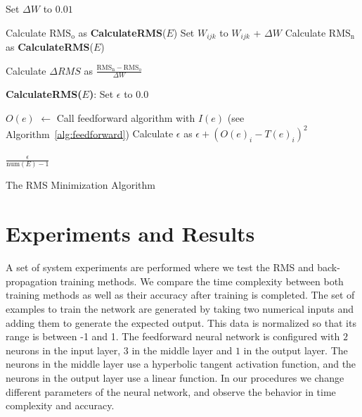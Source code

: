 \documentclass[11pt]{article}
\begin{document}
\begin{algorithm}%
\dontprintsemicolon
{}
Set $\Delta W$ to $0.01$\;
\SetLine
{}
{
	{
		{
				{
					Calculate $\mbox{RMS}_{\mbox{o}}$ as \textbf{CalculateRMS}($E$)\;
					Set $W_{ijk}$ to $W_{ijk}$ + $\Delta W$\;
					Calculate $\mbox{RMS}_{\mbox{n}}$ as \textbf{CalculateRMS}($E$)\;
				
					Calculate $\Delta RMS$ as $ \frac{\mbox{RMS}_{\mbox{n}}-\mbox{RMS}_{\mbox{o}}}{\Delta W} $\;
				
				}
		}
	}
}

\textbf{CalculateRMS($E$)}:
\dontprintsemicolon
{} 
Set $\epsilon$ to $0.0$\;
{
	$O(e)$ $\leftarrow$  Call feedforward algorithm with $I(e)$ (see Algorithm~\ref{alg:feedforward})\;
	{
		Calculate $\epsilon$ as $\epsilon + (O(e)_{i} - T(e)_{i})^{2}$\;
	} 
	
}
\Return $\frac{\epsilon}{\mbox{num}(E) - 1}$ 
\vspace{5mm}
\caption{The RMS Minimization Algorithm}
\label{alg:RMSminimization}
\end{algorithm}




\section{Experiments and Results} %
\label{sec:results}

A set of system experiments are performed where we test the RMS and back-propagation training methods. We compare the time complexity
between both training methods as well as their accuracy after training is completed. The set of examples to train the network are
generated by taking two numerical inputs and adding them to generate the expected output. This data is normalized so that its range is
between -1 and 1. The feedforward neural network is configured with $2$ neurons in the input layer, $3$ in the middle layer and $1$ in
the output layer. The neurons in the middle layer use a hyperbolic tangent activation function, and the neurons in the output layer use
a linear function. In our procedures we change different parameters of the neural network, and observe the behavior in time complexity
and accuracy.
\end{document}
